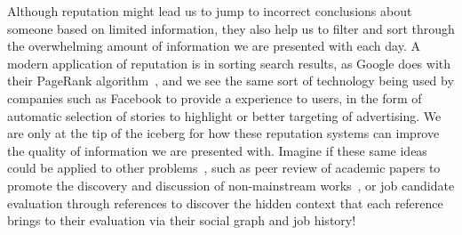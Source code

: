Although reputation might lead us to jump to incorrect conclusions about
someone based on limited information, they also help us to filter and
sort through the overwhelming amount of information we are presented
with each day.
A modern application of reputation is in sorting search
results, as Google does with their PageRank algorithm~\cite{Page1999},
and we see the same sort of technology being used by companies such
as Facebook to provide a  experience to users,
in the form of automatic selection of stories to highlight or
better targeting of advertising.
We are only at the tip of the iceberg for how these reputation systems
can improve the quality of information we are presented with.
Imagine if these same ideas could be applied to other problems~\cite{Adler2011b},
such as peer review of academic papers to promote the discovery and
discussion of non-mainstream works~\cite{Adler2010a},
or job candidate evaluation through references to discover the hidden
context that each reference brings to their evaluation via their social
graph and job history!

